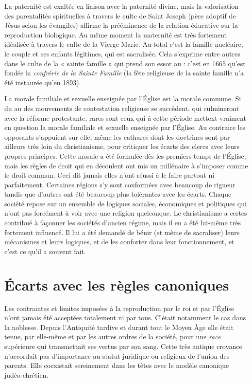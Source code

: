  La paternité est exaltée en liaison avec la paternité divine, mais la valorisation des parentalités spirituelles à travers le culte de Saint Joseph (père adoptif de Jésus selon les évangiles) affirme la prééminence de la relation éducative sur la reproduction biologique. Au même moment la maternité est très fortement idéalisée à travers le culte de la Vierge Marie. Au total c'est la famille nucléaire, le couple et ses enfants légitimes, qui est sacralisée. Cela s'exprime entre autres dans le culte de la « sainte famille » qui prend son essor au  : c'est en 1665 qu'est fondée la \emph{confrérie de la Sainte Famille} (la fête religieuse de la sainte famille n'a été instaurée qu'en 1893). 
 
 La morale familiale et sexuelle enseignée par l'Église est la morale commune. Si du  au  des mouvements de contestation religieuse se succèdent, qui culmineront avec la réforme protestante, rares sont ceux qui à cette période mettent vraiment en question la morale familiale et sexuelle enseignée par l'Église. Au contraire les opposants s'appuient sur elle, même les cathares dont les doctrines sont par ailleurs très loin du christianisme, pour critiquer les écarts des clercs avec leurs propres principes. Cette morale a été formulée dès les premiers temps de l'Église, mais les règles de droit qui en découlent ont mis un millénaire à s'imposer comme le droit commun. Ceci dit jamais elles n'ont réussi à le faire partout ni parfaitement. Certaines régions s'y sont conformées avec beaucoup de rigueur tandis que d'autres ont été beaucoup plus tolérantes avec les écarts. Chaque société repose sur un ensemble de logiques sociales, économiques et politiques qui n'ont pas forcément à voir avec une religion quelconque. Le christianisme a certes contribué à façonner les sociétés d'ancien régime, mais il en a été lui-même très fortement influencé. Il lui a été demandé de bénir (et même de sacraliser) leurs mécanismes et leurs logiques, et de les conforter dans leur fonctionnement, et c'est ce qu'il a souvent fait. 
 
 \section{Écarts avec les règles canoniques}

 Les contraintes et limites imposées à la reproduction par le roi et par l'Église n'ont jamais été acceptées totalement ni par tous. C'était notamment le cas dans la noblesse. Depuis l'Antiquité tardive et durant tout le Moyen Âge elle était tenue, par elle-même et par les autres ordres de la société, pour une \emph{race} supérieure qui transmettait ses vertus par son sang. Cette très antique croyance n'accordait pas d'importance au statut juridique ou religieux de l'union des parents. Elle coexistait sereinement dans les têtes avec le modèle canonique judéo-chrétien. 

